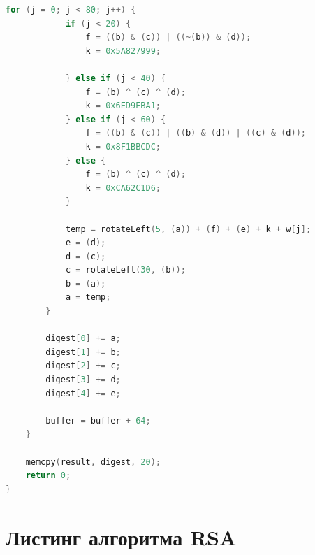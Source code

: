 \begin{lstlisting}[language=C, label=lst:sha1, caption={Реализация алгоритма SHA1}]
        for (j = 0; j < 80; j++) {
            if (j < 20) {
                f = ((b) & (c)) | ((~(b)) & (d));
                k = 0x5A827999;

            } else if (j < 40) {
                f = (b) ^ (c) ^ (d);
                k = 0x6ED9EBA1;
            } else if (j < 60) {
                f = ((b) & (c)) | ((b) & (d)) | ((c) & (d));
                k = 0x8F1BBCDC;
            } else {
                f = (b) ^ (c) ^ (d);
                k = 0xCA62C1D6;
            }

            temp = rotateLeft(5, (a)) + (f) + (e) + k + w[j];
            e = (d);
            d = (c);
            c = rotateLeft(30, (b));
            b = (a);
            a = temp;
        }

        digest[0] += a;
        digest[1] += b;
        digest[2] += c;
        digest[3] += d;
        digest[4] += e;

        buffer = buffer + 64;
    }

    memcpy(result, digest, 20);
    return 0;
}
\end{lstlisting}


\section{Листинг алгоритма RSA}

